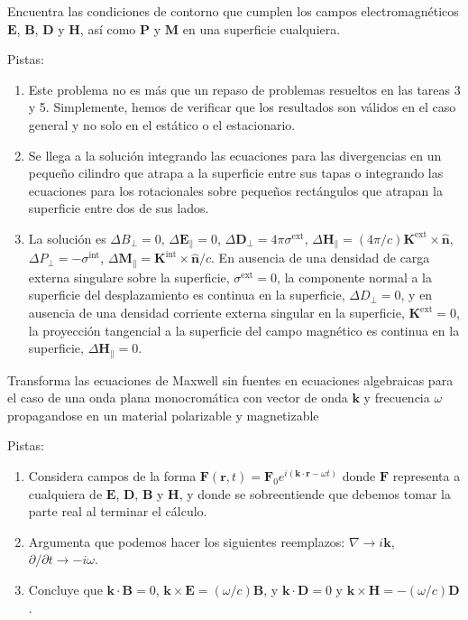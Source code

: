 \documentclass{exam}
\newenvironment{pistas}{\par\noindent Pistas:\begin{enumerate}} {\end{enumerate}}
\begin{document}
\begin{questions}
\question\label{b} Encuentra las condiciones de contorno que cumplen los campos
  electromagnéticos $\bm E$, $\bm B$, $\bm D$ y $\bm H$, así como $\bm
  P$ y $\bm M$ en una superficie cualquiera.
  \begin{pistas}
  \item Este problema no es más que un repaso de problemas resueltos
    en las tareas 3 y 5. Simplemente, hemos de verificar que los
    resultados son válidos en el caso general y no solo en el estático
    o el estacionario.
  \item Se llega a la solución integrando las ecuaciones para las
    divergencias en un pequeño cilindro que atrapa a la superficie
    entre sus tapas o integrando las ecuaciones para los rotacionales
    sobre pequeños rectángulos que atrapan la superficie entre dos de
    sus lados.
  \item La solución es $\Delta B_\perp=0$, $\Delta \bm E_\parallel=0$,
    $\Delta\bm D_\perp=4\pi\sigma^{\text{ext}}$, $\Delta
    \bm H_\|=(4\pi/c)\bm K^{\text{ext}}\times\hat{\bm n}$, $\Delta
    P_\perp=-\sigma^{\text{int}}$, $\Delta\bm M_\|=\bm
    K^{\text{int}}\times\hat{\bm n}/c$. En ausencia de una densidad de
    carga externa singulare sobre la superficie, $\sigma^{\text{ext}}=0$, la
    componente normal a la superficie del desplazamiento es continua
    en la superficie, $\Delta
    D_\perp=0$, y en ausencia de una densidad corriente externa
    singular en la superficie, $\bm K^{\text{ext}}=0$, la proyección
    tangencial a la superficie del campo magnético es continua en la superficie,
    $\Delta\bm H_\|=0$.
  \end{pistas}
\question\label{c} Transforma las ecuaciones de Maxwell sin fuentes en ecuaciones
  algebraicas para el caso de una onda plana monocromática con vector de onda $\bm
  k$ y frecuencia $\omega$ propagandose en un material polarizable y
  magnetizable
  \begin{pistas}
  \item Considera campos de la forma $\bm F(\bm r,t)=\bm F_0 e^{i(\bm
      k\cdot\bm r-\omega t)}$ donde $\bm F$ representa a cualquiera de
    $\bm E$,   $\bm D$,   $\bm B$ y  $\bm H$, y donde se sobreentiende
    que debemos tomar la parte real al terminar el cálculo.
  \item Argumenta que podemos hacer los siguientes reemplazos:
    $\nabla\to i\bm k$, $\partial/\partial t\to -i\omega$.
  \item Concluye que
    $\bm k\cdot\bm B=0$, $\bm k\times\bm
    E=(\omega/c)\bm B$, y $\bm k\cdot\bm D=0$ y $\bm k\times\bm H=-(\omega/c)\bm D$.

\end{pistas}
\end{questions}
\end{document}
